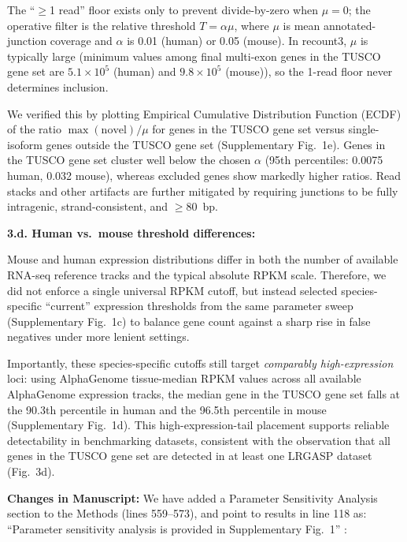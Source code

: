 \documentclass[11pt]{article}
\newcommand{\tuscoGeneSet}{TUSCO gene set}
\begin{document}
\begin{responseboxnew}
The ``$\geq$1 read'' floor exists only to prevent divide-by-zero when $\mu=0$; the operative filter is the relative threshold $T=\alpha\mu$, where $\mu$ is mean annotated-junction coverage and $\alpha$ is 0.01 (human) or 0.05 (mouse). In recount3, $\mu$ is typically large (minimum values among final multi-exon genes in the TUSCO gene set are $5.1\times10^5$ (human) and $9.8\times10^5$ (mouse)), so the 1-read floor never determines inclusion.

We verified this by plotting Empirical Cumulative Distribution Function (ECDF) of the ratio $\max(\text{novel})/\mu$ for genes in the TUSCO gene set versus single-isoform genes outside the TUSCO gene set (Supplementary Fig.~1e). Genes in the TUSCO gene set cluster well below the chosen $\alpha$ (95th percentiles: 0.0075 human, 0.032 mouse), whereas excluded genes show markedly higher ratios. Read stacks and other artifacts are further mitigated by requiring junctions to be fully intragenic, strand-consistent, and $\geq$80~bp.

\vspace{0.3cm}
\textbf{3.d. Human vs.\ mouse threshold differences:}

Mouse and human expression distributions differ in both the number of available RNA-seq reference tracks and the typical absolute RPKM scale. Therefore, we did not enforce a single universal RPKM cutoff, but instead selected species-specific ``current'' expression thresholds from the same parameter sweep (Supplementary Fig.~1c) to balance gene count against a sharp rise in false negatives under more lenient settings.

Importantly, these species-specific cutoffs still target \emph{comparably high-expression} loci: using AlphaGenome tissue-median RPKM values across all available AlphaGenome expression tracks, the median gene in the TUSCO gene set falls at the 90.3th percentile in human and the 96.5th percentile in mouse (Supplementary Fig.~1d). This high-expression-tail placement supports reliable detectability in benchmarking datasets, consistent with the observation that all genes in the \tuscoGeneSet{} are detected in at least one LRGASP dataset (Fig.~3d).

\vspace{0.3cm}
\textbf{Changes in Manuscript:} We have added a Parameter Sensitivity Analysis section to the Methods (lines 559--573), and point to results in line 118 as: ``Parameter sensitivity analysis is provided in Supplementary Fig.~1'' :


\end{responseboxnew}
\end{document}
